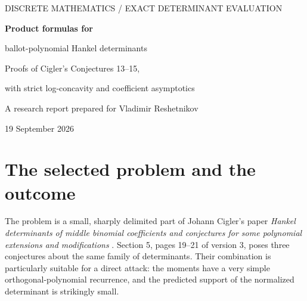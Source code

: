 \documentclass[11pt,letterpaper]{article}
\numberwithin{equation}{section}
\theoremstyle{definition}
\begin{document}
\thispagestyle{empty}
\begin{center}
{\color{accent}\small DISCRETE MATHEMATICS \quad / \quad EXACT DETERMINANT EVALUATION}\par
\vspace{0.6em}
{\LARGE\bfseries Product formulas for\par
ballot-polynomial Hankel determinants}\par
\vspace{0.6em}
{\large Proofs of Cigler's Conjectures 13--15,\par
with strict log-concavity and coefficient asymptotics}\par
\vspace{1em}
{\normalsize A research report prepared for Vladimir Reshetnikov}\par
{\small 19 September 2026}
\end{center}
\vspace{0.5em}
\begin{abstract}
We study the shifted Hankel determinants of the ballot polynomials
\(a_m(t)=\sum_{h\le m/2}(\binom mh-\binom m{h-1})t^h\).
An explicit evaluation expresses every normalized determinant as a sum of
only \(\lfloor k/2\rfloor+1\) monomials, whose coefficients are products
of two elementary Vandermonde-type factors. This establishes the sign,
support, and positivity asserted in Conjecture 13 of Cigler's 2021 paper.
The same products are polynomial in the matrix size on each parity class.
Their degree and a negative-index reflection establish the rational
generating functions, exact numerator degrees, and reciprocity identities
of Conjectures 14 and 15. Moreover, all the residual coefficient sequences
are strictly log-concave, and after normalization they converge to a
binomial distribution for fixed shift. The proof is self-contained: a
block determinant reduces an \(n\)-by-\(n\) Hankel determinant to a
\(k\)-by-\(k\) coefficient determinant; a two-term orthogonal-polynomial
connection then collapses its expansion to parity-separated Vandermondes.
Exact verification code, symbolic numerator data, and coefficient tables
accompany the article.
\end{abstract}

\section{The selected problem and the outcome}\label{sec:problem}
The problem is a small, sharply delimited part of Johann Cigler's paper
\emph{Hankel determinants of middle binomial coefficients and conjectures
for some polynomial extensions and modifications}
\cite{Cigler2021}. Section 5, pages 19--21 of version 3, poses three
conjectures about the same family of determinants. Their combination is
particularly suitable for a direct attack: the moments have a very simple
orthogonal-polynomial recurrence, and the predicted support of the
normalized determinant is strikingly small.
\end{document}
